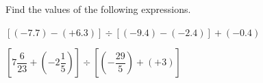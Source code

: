  Find the values of the following expressions.

\begin{subparts}
  \item $[(-7.7)-(+6.3)]\div[(-9.4)-(-2.4)]+(-0.4)$
  \item $\left[7\dfrac{6}{23}+\left(-2\dfrac{1}{5}\right)\right]\div\left[\left(-\dfrac{29}{5}\right)+(+3)\right]$
\end{subparts}

